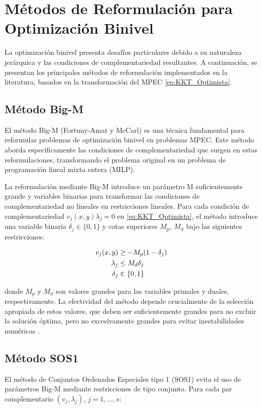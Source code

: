\section{Métodos de Reformulación para Optimización Binivel}
La optimización binivel presenta desafíos particulares debido a su naturaleza jerárquica y las condiciones de complementariedad resultantes. A continuación, se presentan los principales métodos de reformulación implementados en la literatura, basados en la transformación del MPEC \eqref{eq:KKT_Optimista}.
\subsection{Método Big-M}

El método Big-M (Fortuny-Amat y McCarl)  es una técnica fundamental para reformular problemas de optimización binivel en problemas MPEC. 
Este método aborda específicamente las condiciones de complementariedad que surgen en estas reformulaciones, transformando el problema original en un problema de programación lineal mixta entera (MILP).

La reformulación mediante Big-M introduce un parámetro M suficientemente grande y variables binarias para transformar las condiciones de complementariedad no lineales en restricciones lineales. Para cada condición de complementariedad 
$v_j(x,y)\lambda_j = 0$ en \eqref{eq:KKT_Optimista}, el método introduce una variable binaria  $\delta_j \in \{0,1\}$ y cotas superiores $M_p$, $M_d$ bajo  las siguientes restricciones:

\begin{align}
    v_j(x,y) &\geq -M_p(1 - \delta_j) \notag \\
    \lambda_j &\leq M_d \delta_j \\
    \delta_j &\in \{0,1\} \notag
\end{align}

donde $M_p$ y $M_d$ son valores grandes para las variables primales y duales, respectivamente. La efectividad del método depende crucialmente de la selección apropiada de estos valores, que deben ser suficientemente grandes para no excluir la solución óptima, pero no excesivamente grandes para evitar inestabilidades numéricas \cite{BilevelJump}.


\subsection{Método SOS1}

El método de Conjuntos Ordenados Especiales tipo 1 (SOS1) evita el uso de parámetros Big-M mediante restricciones de tipo conjunto. Para cada par complementario $(v_j, \lambda_j)$, $j=1,\ldots, s$:


